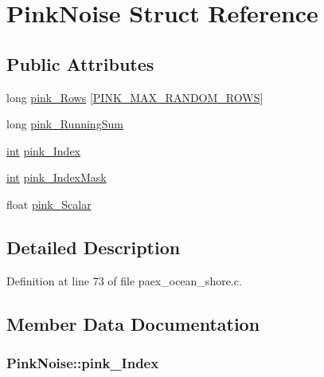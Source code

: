 \hypertarget{struct_pink_noise}{}\section{Pink\+Noise Struct Reference}
\label{struct_pink_noise}
\subsection*{Public Attributes}
\begin{DoxyCompactItemize}
\item 
long \hyperlink{struct_pink_noise_a90f3690a00caf756322dd0b4b2308e50}{pink\+\_\+\+Rows} \mbox{[}\hyperlink{paex__pink_8c_aacad2d0d75b07d001133a8227bb16a09}{P\+I\+N\+K\+\_\+\+M\+A\+X\+\_\+\+R\+A\+N\+D\+O\+M\+\_\+\+R\+O\+WS}\mbox{]}
\item 
long \hyperlink{struct_pink_noise_ab098ff066483c79993a84749bcd3a297}{pink\+\_\+\+Running\+Sum}
\item 
\hyperlink{xmltok_8h_a5a0d4a5641ce434f1d23533f2b2e6653}{int} \hyperlink{struct_pink_noise_ac7476c256f5e2299b6558d6d1aaafe32}{pink\+\_\+\+Index}
\item 
\hyperlink{xmltok_8h_a5a0d4a5641ce434f1d23533f2b2e6653}{int} \hyperlink{struct_pink_noise_af8a954114efd034de29ab479d01a397d}{pink\+\_\+\+Index\+Mask}
\item 
float \hyperlink{struct_pink_noise_aacf66ab73ec48c6d7777a7e3a58595ca}{pink\+\_\+\+Scalar}
\end{DoxyCompactItemize}


\subsection{Detailed Description}


Definition at line 73 of file paex\+\_\+ocean\+\_\+shore.\+c.



\subsection{Member Data Documentation}
\subsubsection[{\texorpdfstring{pink\+\_\+\+Index}{pink_Index}}]{ Pink\+Noise\+::pink\+\_\+\+Index}\hypertarget{struct_pink_noise_ac7476c256f5e2299b6558d6d1aaafe32}{}\label{struct_pink_noise_ac7476c256f5e2299b6558d6d1aaafe32}


